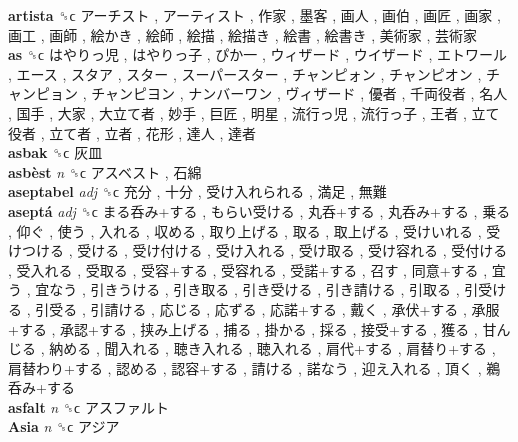 \textbf{artista} ␝ϲ   アーチスト ,  アーティスト ,  作家 ,  墨客 ,  画人 ,  画伯 ,  画匠 ,  画家 ,  画工 ,  画師 ,  絵かき ,  絵師 ,  絵描 ,  絵描き ,  絵書 ,  絵書き ,  美術家 ,  芸術家   \\
\textbf{as} ␝ϲ   はやりっ児 ,  はやりっ子 ,  ぴか一 ,  ウィザード ,  ウイザード ,  エトワール ,  エース ,  スタア ,  スター ,  スーパースター ,  チャンピォン ,  チャンピオン ,  チャンピョン ,  チャンピヨン ,  ナンバーワン ,  ヴィザード ,  優者 ,  千両役者 ,  名人 ,  国手 ,  大家 ,  大立て者 ,  妙手 ,  巨匠 ,  明星 ,  流行っ児 ,  流行っ子 ,  王者 ,  立て役者 ,  立て者 ,  立者 ,  花形 ,  達人 ,  達者   \\
\textbf{asbak} ␝ϲ   灰皿   \\
\textbf{asbèst} \emph{n}  ␝ϲ   アスベスト ,  石綿   \\
\textbf{aseptabel} \emph{adj}  ␝ϲ   充分 ,  十分 ,  受け入れられる ,  満足 ,  無難   \\
\textbf{aseptá} \emph{adj}  ␝ϲ   まる呑み+する ,  もらい受ける ,  丸呑+する ,  丸呑み+する ,  乗る ,  仰ぐ ,  使う ,  入れる ,  収める ,  取り上げる ,  取る ,  取上げる ,  受けいれる ,  受けつける ,  受ける ,  受け付ける ,  受け入れる ,  受け取る ,  受け容れる ,  受付ける ,  受入れる ,  受取る ,  受容+する ,  受容れる ,  受諾+する ,  召す ,  同意+する ,  宜う ,  宜なう ,  引きうける ,  引き取る ,  引き受ける ,  引き請ける ,  引取る ,  引受ける ,  引受る ,  引請ける ,  応じる ,  応ずる ,  応諾+する ,  戴く ,  承伏+する ,  承服+する ,  承認+する ,  挟み上げる ,  捕る ,  掛かる ,  採る ,  接受+する ,  獲る ,  甘んじる ,  納める ,  聞入れる ,  聴き入れる ,  聴入れる ,  肩代+する ,  肩替り+する ,  肩替わり+する ,  認める ,  認容+する ,  請ける ,  諾なう ,  迎え入れる ,  頂く ,  鵜呑み+する   \\
\textbf{asfalt} \emph{n}  ␝ϲ   アスファルト   \\
\textbf{Asia} \emph{n}  ␝ϲ   アジア   \\
